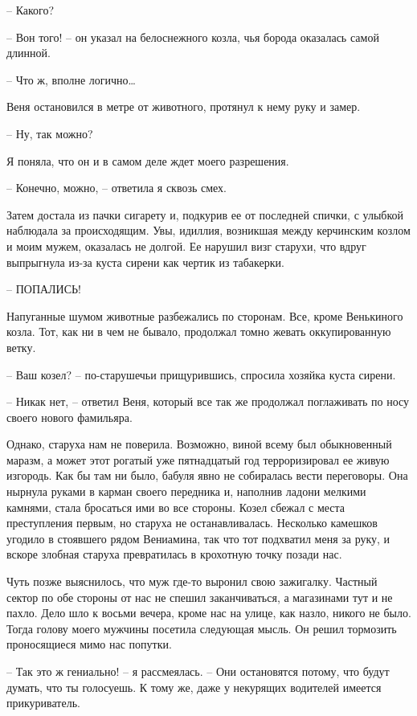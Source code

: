 \documentclass[
]{book}
\begin{document}
-- Какого?

-- Вон того! -- он указал на белоснежного козла, чья борода оказалась самой длинной.

-- Что ж, вполне логично\ldots{}

Веня остановился в метре от животного, протянул к нему руку и замер.

-- Ну, так можно?

Я поняла, что он и в самом деле ждет моего разрешения.

-- Конечно, можно, -- ответила я сквозь смех.

Затем достала из пачки сигарету и, подкурив ее от последней спички, с улыбкой наблюдала за происходящим. Увы, идиллия, возникшая между керчинским козлом и моим мужем, оказалась не долгой. Ее нарушил визг старухи, что вдруг выпрыгнула из-за куста сирени как чертик из табакерки.

-- ПОПАЛИСЬ!

Напуганные шумом животные разбежались по сторонам. Все, кроме Венькиного козла. Тот, как ни в чем не бывало, продолжал томно жевать оккупированную ветку.

-- Ваш козел? -- по-старушечьи прищурившись, спросила хозяйка куста сирени.

-- Никак нет, -- ответил Веня, который все так же продолжал поглаживать по носу своего нового фамильяра.

Однако, старуха нам не поверила. Возможно, виной всему был обыкновенный маразм, а может этот рогатый уже пятнадцатый год терроризировал ее живую изгородь. Как бы там ни было, бабуля явно не собиралась вести переговоры. Она нырнула руками в карман своего передника и, наполнив ладони мелкими камнями, стала бросаться ими во все стороны. Козел сбежал с места преступления первым, но старуха не останавливалась. Несколько камешков угодило в стоявшего рядом Вениамина, так что тот подхватил меня за руку, и вскоре злобная старуха превратилась в крохотную точку позади нас.

Чуть позже выяснилось, что муж где-то выронил свою зажигалку. Частный сектор по обе стороны от нас не спешил заканчиваться, а магазинами тут и не пахло. Дело шло к восьми вечера, кроме нас на улице, как назло, никого не было. Тогда голову моего мужчины посетила следующая мысль. Он решил тормозить проносящиеся мимо нас попутки.

-- Так это ж гениально! -- я рассмеялась. -- Они остановятся потому, что будут думать, что ты голосуешь. К тому же, даже у некурящих водителей имеется прикуриватель.
\end{document}
